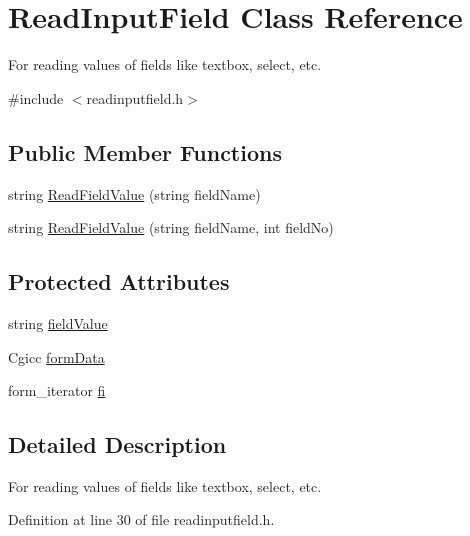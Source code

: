 \hypertarget{classReadInputField}{\section{Read\-Input\-Field Class Reference}
\label{classReadInputField}
}


For reading values of fields like textbox, select, etc.  




{\ttfamily \#include $<$readinputfield.\-h$>$}

\subsection*{Public Member Functions}
\begin{DoxyCompactItemize}
\item 
string \hyperlink{classReadInputField_a7f6e49b47412649644cc644927ccc682}{Read\-Field\-Value} (string field\-Name)
\item 
string \hyperlink{classReadInputField_accf7ceba77721a35968c69268e4e559e}{Read\-Field\-Value} (string field\-Name, int field\-No)
\end{DoxyCompactItemize}
\subsection*{Protected Attributes}
\begin{DoxyCompactItemize}
\item 
string \hyperlink{classReadInputField_a0d95496b5fc8fb4badd4af19492182ae}{field\-Value}
\item 
Cgicc \hyperlink{classReadInputField_a1e4ebac8979fd9b2771320d669fce5fc}{form\-Data}
\item 
form\-\_\-iterator \hyperlink{classReadInputField_ae252dc321be04c2c1afa6928ad16a45d}{fi}
\end{DoxyCompactItemize}


\subsection{Detailed Description}
For reading values of fields like textbox, select, etc. 

Definition at line 30 of file readinputfield.\-h.



